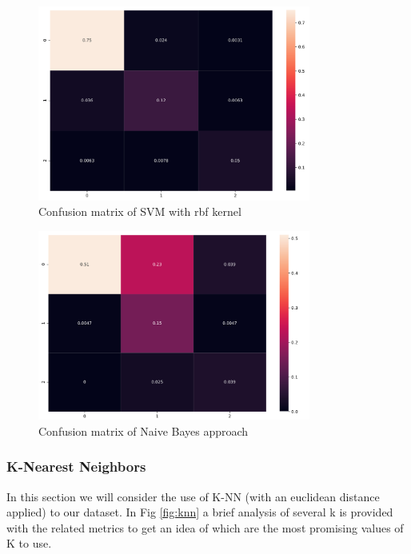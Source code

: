 \documentclass[a4paper,12pt]{article}
\begin{document}
\begin{figure}[H]
  \begin{center}
  \includegraphics[width=0.8\textwidth]{images/svm_rbf.png}
  \end{center}
  \caption{Confusion matrix of SVM with rbf kernel}
  \label{fig:confusion_svm}
\end{figure}

\begin{figure}[H]
  \begin{center}
  \includegraphics[width=0.8\textwidth]{images/confusion_naive.png}
  \end{center}
  \caption{Confusion matrix of Naive Bayes approach}
  \label{fig:confusion_bayes}
\end{figure}

\subsubsection{K-Nearest Neighbors}
In this section we will consider the use of K-NN (with an euclidean distance applied) to our dataset. In Fig \ref{fig:knn} a brief analysis of several k is provided with the related metrics to get an idea of which are the most promising values of K to use.
\end{document}
